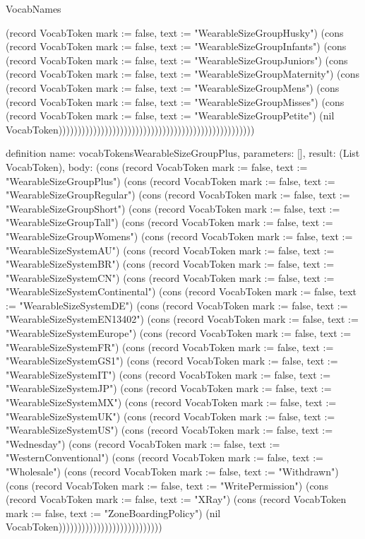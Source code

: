 \begin{lexlean}{VocabNames}
\begin{semanticmodule}
{(record VocabToken {mark := false, text := "WearableSizeGroupHusky"}) (cons (record VocabToken {mark := false, text := "WearableSizeGroupInfants"}) (cons (record VocabToken {mark := false, text := "WearableSizeGroupJuniors"}) (cons (record VocabToken {mark := false, text := "WearableSizeGroupMaternity"}) (cons (record VocabToken {mark := false, text := "WearableSizeGroupMens"}) (cons (record VocabToken {mark := false, text := "WearableSizeGroupMisses"}) (cons (record VocabToken {mark := false, text := "WearableSizeGroupPetite"}) (nil VocabToken)))))))))))))))))))))))))))))))))))))))))))))))))))
}

definition{
  name: vocabTokensWearableSizeGroupPlus,
  parameters: [],
  result: (List VocabToken),
  body: (cons (record VocabToken {mark := false, text := "WearableSizeGroupPlus"}) (cons (record VocabToken {mark := false, text := "WearableSizeGroupRegular"}) (cons (record VocabToken {mark := false, text := "WearableSizeGroupShort"}) (cons (record VocabToken {mark := false, text := "WearableSizeGroupTall"}) (cons (record VocabToken {mark := false, text := "WearableSizeGroupWomens"}) (cons (record VocabToken {mark := false, text := "WearableSizeSystemAU"}) (cons (record VocabToken {mark := false, text := "WearableSizeSystemBR"}) (cons (record VocabToken {mark := false, text := "WearableSizeSystemCN"}) (cons (record VocabToken {mark := false, text := "WearableSizeSystemContinental"}) (cons (record VocabToken {mark := false, text := "WearableSizeSystemDE"}) (cons (record VocabToken {mark := false, text := "WearableSizeSystemEN13402"}) (cons (record VocabToken {mark := false, text := "WearableSizeSystemEurope"}) (cons (record VocabToken {mark := false, text := "WearableSizeSystemFR"}) (cons (record VocabToken {mark := false, text := "WearableSizeSystemGS1"}) (cons (record VocabToken {mark := false, text := "WearableSizeSystemIT"}) (cons (record VocabToken {mark := false, text := "WearableSizeSystemJP"}) (cons (record VocabToken {mark := false, text := "WearableSizeSystemMX"}) (cons (record VocabToken {mark := false, text := "WearableSizeSystemUK"}) (cons (record VocabToken {mark := false, text := "WearableSizeSystemUS"}) (cons (record VocabToken {mark := false, text := "Wednesday"}) (cons (record VocabToken {mark := false, text := "WesternConventional"}) (cons (record VocabToken {mark := false, text := "Wholesale"}) (cons (record VocabToken {mark := false, text := "Withdrawn"}) (cons (record VocabToken {mark := false, text := "WritePermission"}) (cons (record VocabToken {mark := false, text := "XRay"}) (cons (record VocabToken {mark := false, text := "ZoneBoardingPolicy"}) (nil VocabToken)))))))))))))))))))))))))))
}


\end{semanticmodule}
\end{lexlean}
